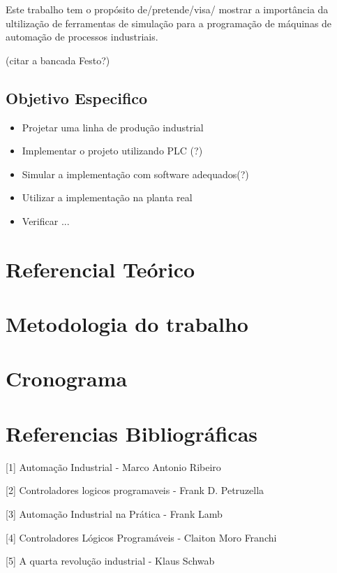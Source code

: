 \documentclass[a4paper, 12pt]{article}
\begin{document}
Este trabalho tem o propósito de/pretende/visa/ mostrar a importância da 
ultilização de ferramentas de simulação para a programação de máquinas de
automação de processos industriais.

(citar a bancada Festo?)

\subsection{Objetivo Especifico}

\begin{itemize}
  \item Projetar uma linha de produção industrial
  \item Implementar o projeto utilizando PLC (?)
  \item Simular a implementação com software adequados(?)
  \item Utilizar a implementação na planta real
  \item Verificar ...
\end{itemize}

\section{Referencial Teórico}

\section{Metodologia do trabalho}

\section{Cronograma}

\section{Referencias Bibliográficas}

[1] Automação Industrial - Marco Antonio Ribeiro

[2] Controladores logicos programaveis - Frank D. Petruzella

[3] Automação Industrial na Prática - Frank Lamb

[4] Controladores Lógicos Programáveis - Claiton Moro Franchi

[5] A quarta revolução industrial - Klaus Schwab
\end{document}
